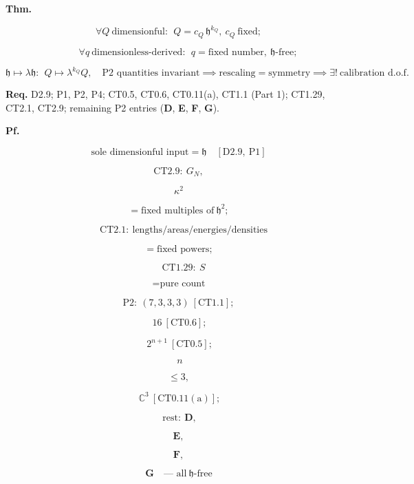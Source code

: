 \begin{theorem}\label{tag:CT2-11}
\textbf{Thm.}

\[
\forall Q\ \text{dimensionful}:\ \ Q=c_Q\,\mathfrak h^{k_Q},\ c_Q\ \text{fixed};
\]

\[
\qquad \forall q\ \text{dimensionless-derived}:\ \ q=\text{fixed number},\ \mathfrak h\text{-free};
\]

\[
\mathfrak h\mapsto\lambda\mathfrak h:\ \ Q\mapsto\lambda^{k_Q}Q,\quad\text{P2 quantities invariant}\implies\text{rescaling}=\text{symmetry}\implies\exists!\ \text{calibration d.o.f.}
\]

\textbf{Req.} D2.9; P1, P2, P4; CT0.5, CT0.6, CT0.11(a), CT1.1 (Part 1); CT1.29, CT2.1, CT2.9; remaining P2 entries (\textbf{D}, \textbf{E}, \textbf{F}, \textbf{G}).

\textbf{Pf.}

\[
\text{sole dimensionful input}=\mathfrak h\quad[\mathrm{D2.9},\ \mathrm{P1}]
\]

\[
\mathrm{CT2.9}:\ G_N,
\]

\[
\kappa^2
\]

\[
= \text{fixed multiples of}\ \mathfrak h^2;
\]

\[
\quad\mathrm{CT2.1}:\ \text{lengths/areas/energies/densities}
\]

\[
= \text{fixed powers};
\]

\[
\quad\mathrm{CT1.29}:\ S
\]

\[
= \text{pure count}
\]

\[
\mathrm{P2}:\ (7,3,3,3)\ [\mathrm{CT1.1}];
\]

\[
\ 16\ [\mathrm{CT0.6}];
\]

\[
\ 2^{n+1}\ [\mathrm{CT0.5}];
\]

\[
\ n
\]

\[
\le 3,
\]

\[
\ \mathbb C^3\ [\mathrm{CT0.11(a)}];
\]

\[
\ \text{rest}:\ \mathbf{D},
\]

\[
\mathbf{E},
\]

\[
\mathbf{F},
\]

\[
\mathbf{G}\quad\text{--- all}\ \mathfrak h\text{-free}
\]


\end{theorem}
